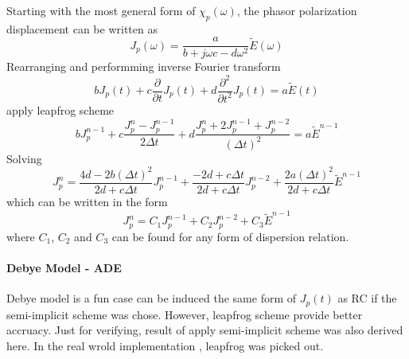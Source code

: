 Starting with the most general form of $\chi_p(\omega)$, the phasor polarization displacement can be written
as
\begin{equation}
  J_p(\omega) = \frac{a}{b + j\omega c - d\omega^2}\widetilde{E}(\omega)
\end{equation}
Rearranging and performming inverse Fourier transform 
\begin{equation}
  bJ_p(t) + c \frac{\partial}{\partial t}J_p(t) + d \frac{\partial ^2}{\partial t^2}J_p(t) = a\widetilde{E}(t)
\end{equation}
apply leapfrog scheme 
\begin{equation}
  bJ_p^{n-1} + c \frac{J_p^n - J_p^{n-1}}{2\Delta t} + d \frac{J_p^n + 2J_p^{n-1} + J_p^{n-2}}{(\Delta t)^2} = a\widetilde{E}^{n-1}
\end{equation}
Solving 
\begin{equation}
  J_p^n = \frac{4d-2b(\Delta t)^2}{2d+c\Delta t}J_p^{n-1} + \frac{-2d+c\Delta t}{2d+c\Delta t}J_p^{n-2} + \frac{2a(\Delta t)^2}{2d+c\Delta t}\widetilde{E}^{n-1}
\end{equation}
which can be written in the form 
\begin{equation}
  J_p^n = C_1 J_p^{n-1} + C_2 J_p^{n-2} + C_3 \widetilde{E}^{n-1}
\end{equation}
where $C_1$, $C_2$ and $C_3$ can be found for any form of dispersion relation.



\paragraph{{\msjh Debye Model - ADE}}
Debye model is a fun case can be induced the same form of $J_p(t)$ as RC if the semi-implicit scheme was chose. However,
leapfrog scheme provide better accruacy. Just for verifying, result of apply semi-implicit scheme was also derived
here. In the real wrold implementation \textit{}, leapfrog was picked out.

